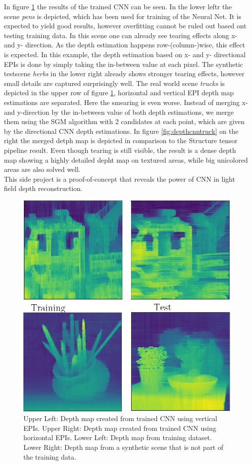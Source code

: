 \documentclass  [
  paper    = a4,
  BCOR     = 10mm,
  twoside,
  fontsize = 12pt,
  fleqn,
  toc      = bibnumbered,
  toc      = listofnumbered,
  numbers  = noendperiod,
  headings = normal,
  listof   = leveldown,
  version  = 3.03
]                                       {scrreprt}
\begin{document}
\begin{appendix}
In figure \ref{fig:cnnepiimages} the results of the trained CNN can be seen. In the lower leftr the scene \textit{pens} is depicted, which has been used for training of the Neural Net. It is expected to yield good results, however overfitting cannot be ruled out based ont testing training data. In this scene one can already see tearing effects along x- and y- direction. As the depth estimation happens row-(column-)wise, this effect is expected. In this example, the depth estimation based on x- and y- directional EPIs is done by simply taking the in-between value at each pixel. The synthetic testscene \textit{herbs} in the lower right already shows stronger tearing effects, however small details are captured surprisingly well. The real world scene \textit{trucks} is depicted in the upper row of figure \ref{fig:cnnepiimages}, horizontal and vertical EPI depth map estimations are separated. Here the smearing is even worse. Instead of merging x- and y-direction by the in-between value of both depth estimations, we merge them using the SGM algorithm with 2 candidates at each point, which are given by the directional CNN depth estimations. In figure \ref{fig:depthcnntruck} on the right the merged detph map is depicted in comparison to the Structure tensor pipeline result. Even though tearing is still visible, the result is a dense depth map showing a highly detailed depht map on textured areas, while big unicolored areas are also solved well.\\
This side project is a proof-of-concept that reveals the power of CNN in light field depth reconstruction.
\begin{figure}
	\centering
	\includegraphics[width=0.7\linewidth]{images/CNN_EPi_images}
	\caption[CNN Results]{Upper Left: Depth map created from trained CNN using vertical EPIs. Upper Right: Depth map created from trained CNN using horizontal EPIs. Lower Left: Depth map from training dataset. Lower Right: Depth map from a synthetic scene that is not part of the training data.}
	\label{fig:cnnepiimages}
\end{figure}


\end{appendix}
\end{document}
